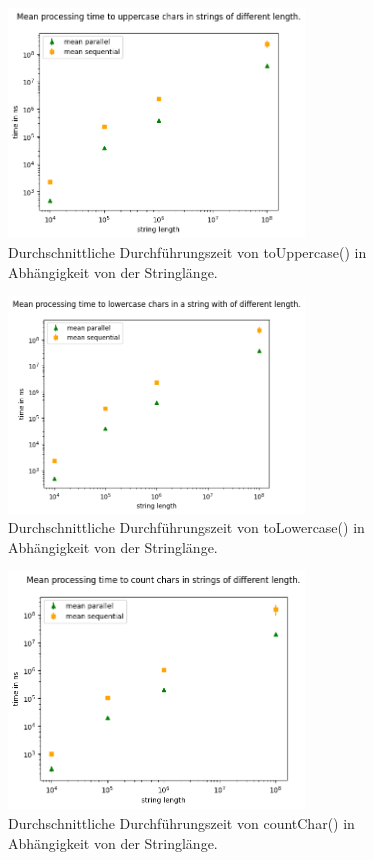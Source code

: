 \documentclass[plainarticle,zihtitle,german,final,hyperref,utf8]{zihpub}
\begin{document}
\begin{figure}[h]
	\begin{center}
		\includegraphics[width=0.7\textwidth]{images/complex_upper.png}
		\caption{Durchschnittliche Durchführungszeit von toUppercase() in Abhängigkeit von der Stringlänge.}
		\label{fig:mean_upper}
	\end{center}
\end{figure}
\begin{figure}[h]
	\begin{center}
		\includegraphics[width=0.7\textwidth]{images/complex_lower.png}
		\caption{Durchschnittliche Durchführungszeit von toLowercase() in Abhängigkeit von der Stringlänge.}
		\label{fig:mean_upper}
	\end{center}
\end{figure}
\begin{figure}[h]
	\begin{center}
		\includegraphics[width=0.7\textwidth]{images/complex_count.png}
		\caption{Durchschnittliche Durchführungszeit von countChar() in Abhängigkeit von der Stringlänge.}
		\label{fig:mean_upper}
	\end{center}
\end{figure}
\end{document}
